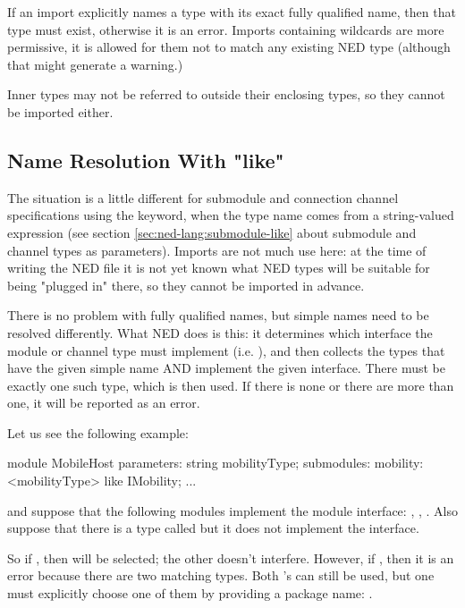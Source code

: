 If an import explicitly names a type with its exact fully qualified name,
then that type must exist, otherwise it is an error. Imports containing
wildcards are more permissive, it is allowed for them not to match any
existing NED type (although that might generate a warning.)

Inner types may not be referred to outside their enclosing types, so they
cannot be imported either.


\subsection{Name Resolution With "like"}
\label{sec:ned-lang:name-resolution-with-like}

The situation is a little different for submodule and connection channel
specifications using the  keyword, when the type name comes
from a string-valued expression (see section
\ref{sec:ned-lang:submodule-like} about submodule and channel types as
parameters). Imports are not much use here: at the time of writing the NED
file it is not yet known what NED types will be suitable for being "plugged
in" there, so they cannot be imported in advance.

There is no problem with fully qualified names, but simple names need
to be resolved differently. What NED does is this: it determines which
interface the module or channel type must implement (i.e. ),
and then collects the types that have the given simple name AND implement
the given interface. There must be exactly one such type, which is then used.
If there is none or there are more than one, it will be reported as an error.

Let us see the following example:

\begin{ned}
module MobileHost
{
    parameters:
        string mobilityType;
    submodules:
        mobility: <mobilityType> like IMobility;
        ...
}
\end{ned}

and suppose that the following modules implement the  module
interface: , ,
. Also suppose that there is a type
called  but it does not implement the
interface.

So if , then
 will be selected; the other
 doesn't interfere. However, if
, then it is an error because there are two
matching  types. Both 's can still be used,
but one must explicitly choose one of them by providing a package name:
.


